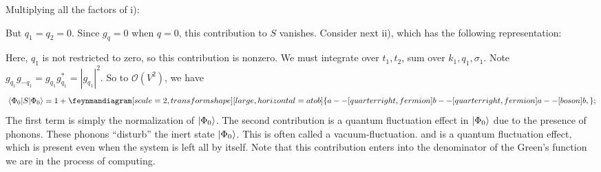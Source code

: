 Multiplying all the factors of i):
\begin{center}
\end{center}
But $q_1=q_2 = 0$. Since $g_q =0$ when $q=0$, this contribution to $S$ vanishes.
Consider next ii), which has the following representation:
\begin{center}
\end{center}
Here, $q_1$ is not restricted to zero, so this contribution is nonzero. We must integrate over $t_1, t_2$, sum over $k_1, q_1, \sigma_1$.
Note $g_{q_1}g_{-q_1} = g_{q_1}g_{q_1}^* = |g_{q_1}|^2$. So to $\mathcal{O}(V^2)$, we have 
\begin{equation} 
\ev{S}{\Phi_0} = 1 +
\begin{gathered}
\feynmandiagram[scale = 2, transform shape][large, horizontal = a to b]{a -- [quarter right, fermion] b -- [quarter right, fermion] a -- [boson] b,};
\end{gathered} 
\end{equation}
The first term is simply the normalization of $\ket{\Phi_0}$. The second contribution is a quantum fluctuation effect in $\ket{\Phi_0}$ due to the presence of phonons. These phonons ``disturb'' the inert state $\ket{\Phi_0}$. This is often called a vacuum-fluctuation. and is a quantum fluctuation effect, which is present even when the system is left all by itself. Note that this contribution enters into the denominator of the Green's function we are in the process of computing. 

